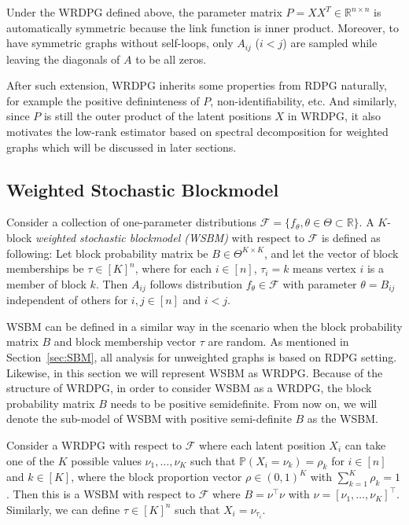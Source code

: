 Under the WRDPG defined above, the parameter matrix $P = X X^T \in \mathbb{R}^{n \times n}$ is automatically symmetric because the link function is inner product. Moreover, to have symmetric graphs without self-loops, only $A_{ij}$ ($i < j$) are sampled while leaving the diagonals of $A$ to be all zeros.

After such extension, WRDPG inherits some properties from RDPG naturally, for example the positive defininteness of $P$, non-identifiability, etc. And similarly, since $P$ is still the outer product of the latent positions $X$ in WRDPG, it also motivates the low-rank estimator based on spectral decomposition for weighted graphs which will be discussed in later sections.




\subsection{Weighted Stochastic Blockmodel}
\label{sec:WSBM}

\begin{definition} 
\label{def:SBM}
Consider a collection of one-parameter distributions $\mathcal{F} = \{ f_{\theta}, \theta \in \Theta \subset \mathbb{R} \}$. A $K$-block {\em{weighted stochastic blockmodel (WSBM)}} with respect to $\mathcal{F}$ is defined as following: Let block probability matrix be $B \in \Theta^{K \times K}$, and let the vector of block memberships be $\tau \in [K]^n$, where for each $i \in [n]$, $\tau_i = k$ means vertex $i$ is a member of block $k$. Then $A_{ij}$ follows distribution $f_{\theta} \in \mathcal{F}$ with parameter $\theta = B_{ij}$ independent of others for $i, j \in [n]$ and $i < j$.
\end{definition}

WSBM can be defined in a similar way in the scenario when the block probability matrix $B$ and block membership vector $\tau$ are random. As mentioned in Section~\ref{sec:SBM}, all analysis for unweighted graphs is based on RDPG setting. Likewise, in this section we will represent WSBM as WRDPG. Because of the structure of WRDPG, in order to consider WSBM as a WRDPG, the block probability matrix $B$ needs to be positive semidefinite. From now on, we will denote the sub-model of WSBM with positive semi-definite $B$ as the WSBM.

\begin{definition} 
\label{def:SBM_RDPG}
Consider a WRDPG with respect to $\mathcal{F}$ where each latent position $X_i$ can take one of the $K$ possible values $\nu_1, \dots, \nu_K$ such that $\mathbb{P}(X_i = \nu_k) = \rho_k$ for $i \in [n]$ and $k \in [K]$, where the block proportion vector $\rho \in (0,1)^K$ with $\sum_{k=1}^K \rho_k = 1$. Then this is a WSBM with respect to $\mathcal{F}$ where $B = \nu^{\top} \nu$ with $\nu = [\nu_1, \dots, \nu_K]^{\top}$. Similarly, we can define $\tau \in [K]^n$ such that $X_i = \nu_{\tau_i}$. 
\end{definition}

